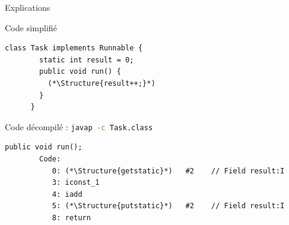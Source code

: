 
\begingroup

\begin{frame}[fragile]{Explications}

  \begin{block}{Code simplifié}
    \begin{lstlisting}[gobble=4]
      class Task implements Runnable {
        static int result = 0;
        public void run() {
          (*\Structure{result++;}*)
        }
      }
    \end{lstlisting}
  \end{block}

  \pause

  \begin{block}{Code décompilé : \lstinline[language=bash]{javap -c Task.class}}
    \begin{lstlisting}[gobble=4]
      public void run();
        Code:
           0: (*\Structure{getstatic}*)   #2    // Field result:I
           3: iconst_1
           4: iadd
           5: (*\Structure{putstatic}*)   #2    // Field result:I
           8: return
    \end{lstlisting}
  \end{block}

\end{frame}

\endgroup
\endinput
